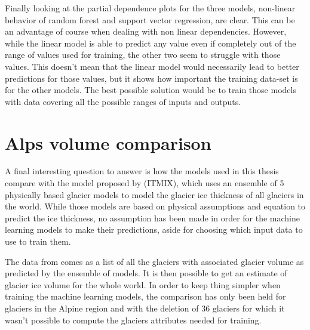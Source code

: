Finally looking at the partial dependence plots for the three models, non-linear behavior of random forest and support vector regression, are clear. This can be an advantage of course when dealing with non linear dependencies. However, while the linear model is able to predict any value even if completely out of the range of values used for training, the other two seem to struggle with those values. This doesn't mean that the linear model would necessarily lead to better predictions for those values, but it shows how important the training data-set is for the other models. The best possible solution would be to train those models with data covering all the possible ranges of inputs and outputs.

\section{Alps volume comparison}\label{disc-alps}
A final interesting question to answer is how the models used in this thesis compare with the model proposed by \citet{Farinotti2019} (ITMIX), which uses an ensemble of 5 physically based glacier models to model the glacier ice thickness of all glaciers in the world. While those models are based on physical assumptions and  equation to predict the ice thickness, no assumption has been made in order for the machine learning models to make their predictions, aside for choosing which input data to use to train them.
 
The data from \citet{Farinotti2019} comes as a list of all the glaciers with associated glacier volume as predicted by the ensemble of models. It is then possible to get an estimate of glacier ice volume for the whole world.
In order to keep thing simpler when training the machine learning models, the comparison has only been held for glaciers in the Alpine region and with the deletion of 36 glaciers for which it wasn't possible to compute the glaciers attributes needed for training.

